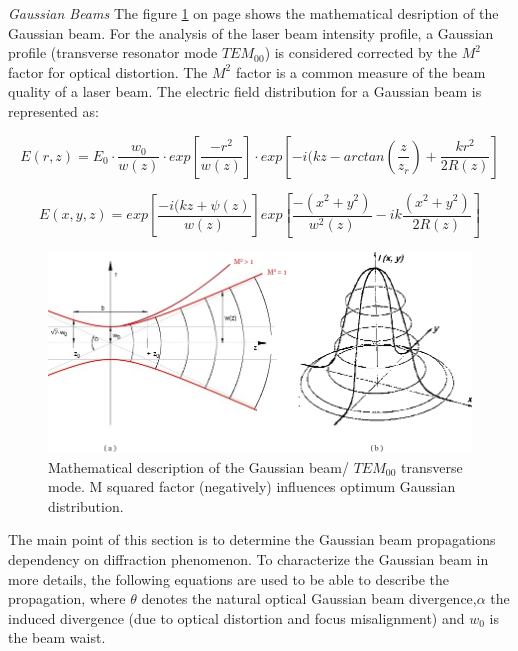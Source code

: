 \textit{Gaussian Beams}
The figure \ref{gaussian_beam} on page \pageref{gaussian_beam} shows the mathematical desription of the Gaussian beam. For the analysis of the \acs{laser} beam intensity profile, a Gaussian profile (transverse resonator mode $TEM_{00}$) is considered corrected by the $M^{2}$ factor for optical distortion. The $M^{2}$ factor is a common measure of the beam quality of a laser beam.  The electric field distribution for a Gaussian beam is represented as:

\begin{equation}
	E(r,z) = E_{0}\cdot \frac{w_{0}}{w(z)} \cdot exp\left[\frac{-r^{2}}{w(z)}\right]\cdot exp\left[-i(kz-arctan\left(\frac{z}{z_{r}}\right)+\frac{kr^{2}}{2R(z)}\right]
\end{equation}

\begin{equation}
	E(x,y,z) = exp\left[\frac{-i(kz + \psi(z)}{w(z)}\right]exp\left[\frac{-(x^{2}+y^{2})}{w^{2}(z)} - ik \frac{(x^{2}+y^{2})}{2R(z)}\right]
\end{equation}

\begin{figure} [ht]
\centering
\includegraphics[scale=0.5]{chapters/img/TEM00.jpg}	
\caption{Mathematical description of the Gaussian beam/ $TEM_{00}$ transverse mode. M squared factor (negatively) influences optimum Gaussian distribution.}
\label{gaussian_beam}
\end{figure}

The main point of this section is to determine the Gaussian beam propagations dependency on diffraction phenomenon. To characterize the Gaussian beam in more details, the following equations are used to be able to describe the propagation, where $\theta$ denotes the natural optical Gaussian beam divergence,$\alpha$ the induced divergence (due to optical distortion and focus misalignment) and $w_{0}$ is the beam waist. 

